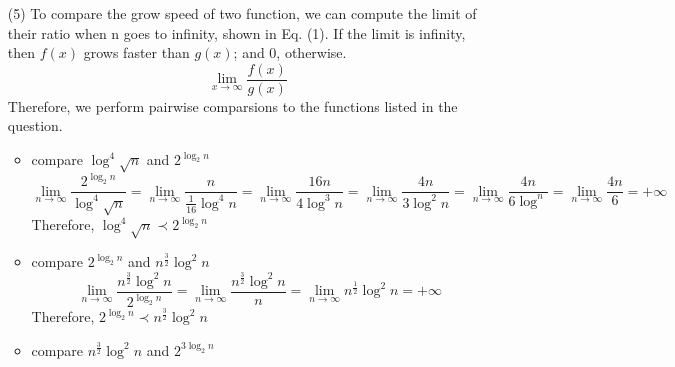 \documentclass[11pt]{article}
\begin{document}
\begin{itemize}
\begin{equation*}
\end{equation*}
(b)
\begin{equation*}
\begin{split}
\frac{\partial f(x,y)}{\partial x} & = \frac{\partial x}{\partial x} e^{2x+3y} + x \frac{\partial (e^{2x+3y})}{\partial x} \\
& = e^{2x+3y} + 2x(e^{2x+3y})\\
& = (2x+1)e^{2x+3y}\\
\end{split}
\end{equation*}
\begin{equation*}
\frac{\partial f(x,y)}{\partial y} = 3xe^{2x+3y}
\end{equation*}
\item[(5)] To compare the grow speed of two function, we can compute the limit of their ratio when n goes to infinity, shown in Eq. (1). If the limit is infinity, then \(f(x)\) grows faster than \(g(x)\); and 0, otherwise.
\begin{equation}
\lim_{x\to\infty} \frac{f(x)}{g(x)}
\end{equation}
Therefore, we perform pairwise comparsions to the functions listed in the question.\\
\begin{itemize}
\item compare \(\log^4\sqrt{n}\) and \(2^{\log_2n}\)\\
\begin{equation*}
 \lim_{n\to\infty} \frac{2^{\log_2n}}{\log^4\sqrt{n}} =  \lim_{n\to\infty} \frac{n}{\frac{1}{16}\log^4n}  =   \lim_{n\to\infty} \frac{16n}{4\log^3n}= \lim_{n\to\infty} \frac{4n}{3\log^2n}= \lim_{n\to\infty} \frac{4n}{6\log^n} = \lim_{n\to\infty} \frac{4n}{6} = +\infty
\end{equation*}
Therefore, \(\log^4\sqrt{n} \prec 2^{\log_2n}\) \\
\item compare \(2^{\log_2n}\) and \(n^{\frac{3}{2}}\log^2n\)
\begin{equation*}
\lim_{n\to\infty} \frac{n^{\frac{3}{2}}\log^2n}{2^{\log_2n}}=\lim_{n\to\infty} \frac{n^{\frac{3}{2}}\log^2n}{n}=\lim_{n\to\infty} n^{\frac{1}{2}}\log^2n=+\infty
\end{equation*}
Therefore, \( 2^{\log_2n}  \prec  n^{\frac{3}{2}}\log^2n    \)\\
\item compare \(n^{\frac{3}{2}}\log^2n\) and \(2^{3\log_2n}\)\\
\begin{equation*}

\end{equation*}
\end{itemize}
\end{itemize}
\end{document}
